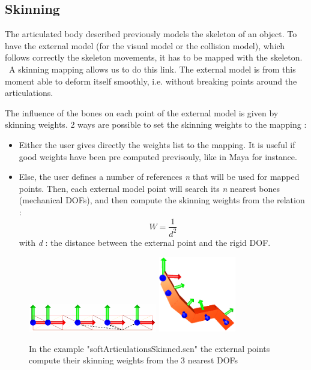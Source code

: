 \subsection{Skinning}

The articulated body described previously models the skeleton of an object.
To have the external model (for the visual model or the collision model), which follows correctly the skeleton movements, it has to be mapped with the skeleton. 
\ 
A skinning mapping allows us to do this link. The external model is from this moment able to deform itself smoothly, i.e. without breaking points around the articulations.

The influence of the bones on each point of the external model is given by skinning weights.
2 ways are possible to set the skinning weights to the mapping :
\begin{itemize}
	\item Either the user gives directly the weights list to the mapping. It is useful if good weights have been pre computed previsouly, like in Maya for instance.
	\item Else, the user defines a number of references \textsl{n} that will be used for mapped points. Then, each external model point will search its \textsl{n} nearest bones (mechanical DOFs), and then compute the skinning weights from the relation :
\[ W = \frac{1}{d^{2}}  \]
\small{ with \textsl{d} : the distance between the external point and the rigid DOF.}
\end{itemize}

\begin{figure}[htpb]
		\centering
		\includegraphics[width=0.50\textwidth]{skinning}
		\includegraphics[width=0.30\textwidth]{skinnedPendulum}	
	\caption{In the example "softArticulationsSkinned.scn" the external points compute their skinning weights from the 3 nearest DOFs}
\end{figure}
